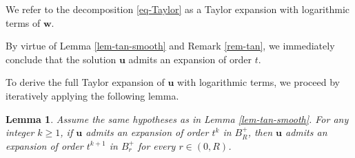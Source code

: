 \documentclass[11pt,reqno]{amsart}
\renewcommand{\geq}{\geqslant}
\newtheorem{lemma}[theorem]{Lemma}
\theoremstyle{definition}
\numberwithin{equation}{section}
\begin{document}
We refer to the decomposition \eqref{eq-Taylor} as a Taylor expansion with logarithmic terms of $\mathbf{w}$.

By virtue of Lemma \ref{lem-tan-smooth} and Remark \ref{rem-tan}, we immediately conclude that the solution $\mathbf{u}$ admits an expansion of order $t$.

To derive the full Taylor expansion of $\mathbf{u}$ with logarithmic terms, we proceed by iteratively applying the following lemma.
\begin{lemma}\label{lem-Taylor-u}
    Assume the same hypotheses as in Lemma \ref{lem-tan-smooth}. For any integer $k\geq 1$, if $\mathbf{u}$ admits an expansion of order $t^k$ in $B^+_R$, then $\mathbf{u}$ admits an expansion of order $t^{k+1}$ in $B^+_r$ for every $r\in (0, R)$.
\end{lemma}
\end{document}
